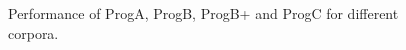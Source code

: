 \documentclass[10pt,journal,compsoc]{IEEEtran}
\begin{document}
\begin{figure}
	\centering
	\hfil
	\hfil
	\caption{Performance of ProgA, ProgB, ProgB+ and ProgC for different corpora.}
	\label{fig:performance_analysis}
\end{figure}
\end{document}
